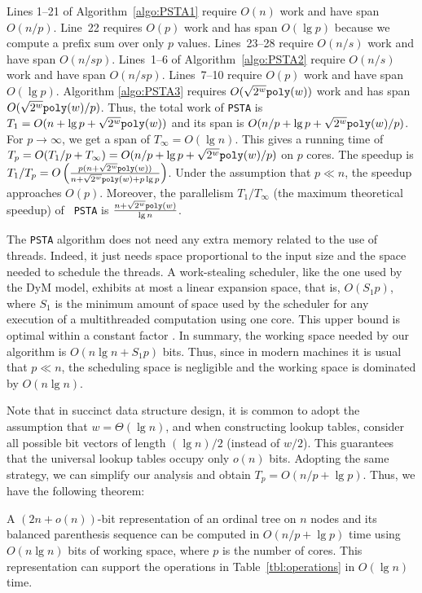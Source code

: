 Lines 1--21 of Algorithm~\ref{algo:PSTA1} require $O(n)$ work and have
span~$O(n/p)$.
Line~22 requires $O(p)$ work and has span $O(\lg p)$ because we compute
a prefix sum over only $p$ values.
Lines~23--28 require $O(n/s)$ work and have span $O(n/sp)$.
Lines~1--6 of Algorithm~\ref{algo:PSTA2} require $O(n/s)$ work and have
span $O(n/sp)$.
Lines~7--10 require $O(p)$ work and have span $O(\lg p)$.
Algorithm \ref{algo:PSTA3} requires $O(\sqrt{2^w}\mathtt{poly}(w))$ work and
has span $O(\sqrt{2^{w}}\mathtt{poly}(w)/p)$.
Thus, the total work of {\tt PSTA} is $T_1 = O(n + \lg p + \sqrt{2^w}\mathtt{poly}(w))$
and its span is $O(n/p + \lg p + \sqrt{2^w}\mathtt{poly}(w)/p)$.
For $p \rightarrow \infty$, we get a span of $T_\infty = O(\lg n)$.
This gives a running time of $T_p = O(T_1/p + T_\infty) =
O(n/p + \lg p + \sqrt{2^w}\mathtt{poly}(w)/p)$ on $p$ cores.
The speedup is $T_1/T_p = O\left(\frac{p(n+\sqrt{2^{w}}\mathtt{poly}(w))}{n+\sqrt{2^{w}}\mathtt{poly}(w)+p\lg
p}\right)$. Under the assumption that $p\ll n$, the speedup approaches
$O(p)$. Moreover, the
parallelism $T_1/T_{\infty}$ (the maximum theoretical speedup) of {\tt
PSTA} is $\frac{n+\sqrt{2^{w}}\mathtt{poly}(w)}{\lg n}$.

The {\tt PSTA} algorithm does not need any extra memory related to the use of
threads. Indeed, it just needs space proportional to the input size
and the space needed to schedule the threads. A work-stealing
scheduler, like the one used by the DyM model, exhibits at most a
linear expansion space, that is, $O(S_1p)$, where $S_1$ is the minimum
amount of space used by the scheduler for any execution of a
multithreaded computation using one core. This upper bound is
optimal within a constant factor
\cite{Blumofe:1999:SMC:324133.324234}. In summary, the working space
needed by our algorithm is $O(n\lg n+S_1p)$ bits. Thus, since in modern
machines it is usual that $p\ll n$, the scheduling space is negligible
and the working space is dominated by $O(n\lg n)$.

Note that in succinct data structure design, it is common to adopt the assumption that $w = \Theta(\lg n)$, and when constructing lookup tables, consider all possible bit vectors of length $(\lg n)/2$ (instead of $w/2$).
This guarantees that the universal lookup tables occupy only $o(n)$ bits.
Adopting the same strategy, we can simplify our analysis and obtain
$T_p = O(n/p + \lg p)$.
Thus, we have the following theorem:
\begin{theorem}\label{lem:lg}
A $(2n+o(n))$-bit representation of an ordinal tree on $n$ nodes and its balanced parenthesis sequence can be computed in $O(n/p + \lg p)$ time using $O(n\lg n)$ bits of working space, where $p$ is the number of cores.
This representation can support the operations in Table~\ref{tbl:operations} in $O(\lg n)$ time.
\end{theorem}